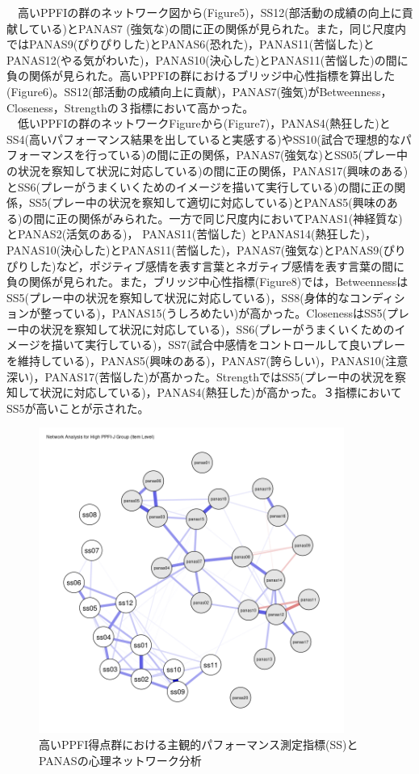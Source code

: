 \documentclass[12pt,a4paper,xelatex,ja=standard]{bxjsarticle}
\begin{document}
　高いPPFIの群のネットワーク図から(Figure5)，SS12(部活動の成績の向上に貢献している)とPANAS7
(強気な)の間に正の関係が見られた。また，同じ尺度内ではPANAS9(ぴりぴりした)とPANAS6(恐れた)，PANAS11(苦悩した)とPANAS12(やる気がわいた)，PANAS10(決心した)とPANAS11(苦悩した)の間に負の関係が見られた。高いPPFIの群におけるブリッジ中心性指標を算出した(Figure6)。SS12(部活動の成績向上に貢献)，PANAS7(強気)がBetweenness，Closeness，Strengthの３指標において高かった。\\
　低いPPFIの群のネットワークFigureから(Figure7)，PANAS4(熱狂した)とSS4(高いパフォーマンス結果を出していると実感する)やSS10(試合で理想的なパフォーマンスを行っている)の間に正の関係，PANAS7(強気な)とSS05(プレー中の状況を察知して状況に対応している)の間に正の関係，PANAS17(興味のある)とSS6(プレーがうまくいくためのイメージを描いて実行している)の間に正の関係，SS5(プレー中の状況を察知して適切に対応している)とPANAS5(興味のある)の間に正の関係がみられた。一方で同じ尺度内においてPANAS1(神経質な)とPANAS2(活気のある)，
PANAS11(苦悩した)
とPANAS14(熱狂した)，PANAS10(決心した)とPANAS11(苦悩した)，PANAS7(強気な)とPANAS9(ぴりぴりした)など，ポジティブ感情を表す言葉とネガティブ感情を表す言葉の間に負の関係が見られた。また，ブリッジ中心性指標(Figure8)では，BetweennessはSS5(プレー中の状況を察知して状況に対応している)，SS8(身体的なコンディションが整っている)，PANAS15(うしろめたい)が高かった。ClosenessはSS5(プレー中の状況を察知して状況に対応している)，SS6(プレーがうまくいくためのイメージを描いて実行している)，SS7(試合中感情をコントロールして良いプレーを維持している)，PANAS5(興味のある)，PANAS7(誇らしい)，PANAS10(注意深い)，PANAS17(苦悩した)が髙かった。StrengthではSS5(プレー中の状況を察知して状況に対応している)，PANAS4(熱狂した)が高かった。３指標においてSS5が高いことが示された。

\begin{figure}[H]
\centering
\includegraphics[clip,width = 10cm]{figure/High_PPFI_J_Network.png}
\caption{高いPPFI得点群における主観的パフォーマンス測定指標(SS)とPANASの心理ネットワーク分析}
\end{figure}
\end{document}
